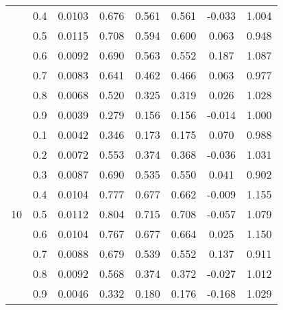 \documentclass[11pt,a4paper]{report}
\begin{document}
\begin{longtable}{ | c | c || c | c | c | c | c | c | }
 & 0.4 & 0.0103 & 0.676 & 0.561 & 0.561 & -0.033 & 1.004 \\
 & 0.5 & 0.0115 & 0.708 & 0.594 & 0.600 & 0.063 & 0.948 \\
 & 0.6 & 0.0092 & 0.690 & 0.563 & 0.552 & 0.187 & 1.087 \\
 & 0.7 & 0.0083 & 0.641 & 0.462 & 0.466 & 0.063 & 0.977 \\
 & 0.8 & 0.0068 & 0.520 & 0.325 & 0.319 & 0.026 & 1.028 \\
 & 0.9 & 0.0039 & 0.279 & 0.156 & 0.156 & -0.014 & 1.000 \\
 \hline
\multirow{9}{*}{10} & 0.1 & 0.0042 & 0.346 & 0.173 & 0.175 & 0.070 & 0.988 \\
 & 0.2 & 0.0072 & 0.553 & 0.374 & 0.368 & -0.036 & 1.031 \\
 & 0.3 & 0.0087 & 0.690 & 0.535 & 0.550 & 0.041 & 0.902 \\
 & 0.4 & 0.0104 & 0.777 & 0.677 & 0.662 & -0.009 & 1.155 \\
 & 0.5 & 0.0112 & 0.804 & 0.715 & 0.708 & -0.057 & 1.079 \\
 & 0.6 & 0.0104 & 0.767 & 0.677 & 0.664 & 0.025 & 1.150 \\
 & 0.7 & 0.0088 & 0.679 & 0.539 & 0.552 & 0.137 & 0.911 \\
 & 0.8 & 0.0092 & 0.568 & 0.374 & 0.372 & -0.027 & 1.012 \\
 & 0.9 & 0.0046 & 0.332 & 0.180 & 0.176 & -0.168 & 1.029 \\
 \hline
\hline
\end{longtable}
\end{document}
